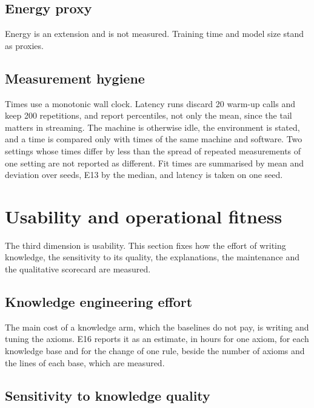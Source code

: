 \subsection{Energy proxy}
\label{sec:energy}

Energy is an extension and is not measured. Training time and model size stand as proxies.

\subsection{Measurement hygiene}
\label{sec:measurement-hygiene}

Times use a monotonic wall clock. Latency runs discard 20 warm-up calls and keep 200
repetitions, and report percentiles, not only the mean, since the tail matters in streaming.
The machine is otherwise idle, the environment is stated, and a time is compared only with times
of the same machine and software. Two settings whose times differ by less than the spread of
repeated measurements of one setting are not reported as different. Fit times are summarised by
mean and deviation over seeds, E13 by the median, and latency is taken on one seed.

\section{Usability and operational fitness}
\label{sec:usability-dimension}

The third dimension is usability. This section fixes how the effort of writing knowledge,
the sensitivity to its quality, the explanations, the maintenance and the qualitative
scorecard are measured.

\subsection{Knowledge engineering effort}
\label{sec:effort}

The main cost of a knowledge arm, which the baselines do not pay, is writing and tuning the
axioms. E16 reports it as an estimate, in hours for one axiom, for each knowledge base and for
the change of one rule, beside the number of axioms and the lines of each base, which are
measured.

\subsection{Sensitivity to knowledge quality}
\label{sec:knowledge-sensitivity}

